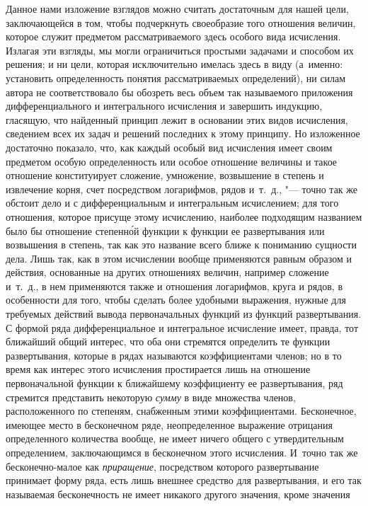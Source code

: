 Данное нами изложение взглядов можно считать достаточным для нашей цели,
заключающейся в том, чтобы подчеркнуть своеобразие того отношения величин,
которое служит предметом рассматриваемого здесь особого вида исчисления.
Излагая эти взгляды, мы могли ограничиться простыми задачами и способом их
решения; и ни цели, которая исключительно имелась здесь в виду (а~именно:
установить определенность понятия рассматриваемых определений), ни силам автора
не соответствовало бы обозреть весь объем так называемого приложения
дифференциального и интегрального исчисления и завершить индукцию, гласящую,
что найденный принцип лежит в основании этих видов исчисления, сведением всех
их задач и решений последних к этому принципу. Но изложенное достаточно
показало, что, как каждый особый вид исчисления имеет своим предметом особую
определенность или особое отношение величины и такое отношение конституирует
сложение, умножение, возвышение в степень и извлечение корня, счет посредством
логарифмов, рядов и~т.~д., "--- точно так же обстоит дело и с дифференциальным
и интегральным исчислением; для того отношения, которое присуще этому
исчислению, наиболее подходящим названием было бы отношение степенн\'{о}й
функции к функции ее развертывания или возвышения в степень, так как это
название всего ближе к пониманию сущности дела. Лишь так, как в этом исчислении
вообще применяются равным образом и действия, основанные на других отношениях
величин, например сложение и~т.~д., в нем применяются также и отношения
логарифмов, круга и рядов, в особенности для того, чтобы сделать более удобными
выражения, нужные для требуемых действий вывода первоначальных функций из
функций развертывания. С формой ряда дифференциальное и интегральное исчисление
имеет, правда, тот ближайший общий интерес, что оба они стремятся определить те
функции развертывания, которые в рядах называются коэффициентами членов; но в
то время как интерес этого исчисления простирается лишь на отношение
первоначальной функции к ближайшему коэффициенту ее развертывания, ряд
стремится представить некоторую {\em сумму} в виде множества членов,
расположенного по степеням, снабженным этими коэффициентами. Бесконечное,
имеющее место в бесконечном ряде, неопределенное выражение отрицания
определенного количества вообще, не имеет ничего общего с утвердительным
определением, заключающимся в бесконечном этого исчисления. И~точно так же
бесконечно-малое как {\em приращение}, посредством которого развертывание
принимает форму ряда, есть лишь внешнее средство для развертывания, и его так
называемая бесконечность не имеет никакого другого значения, кроме значения

